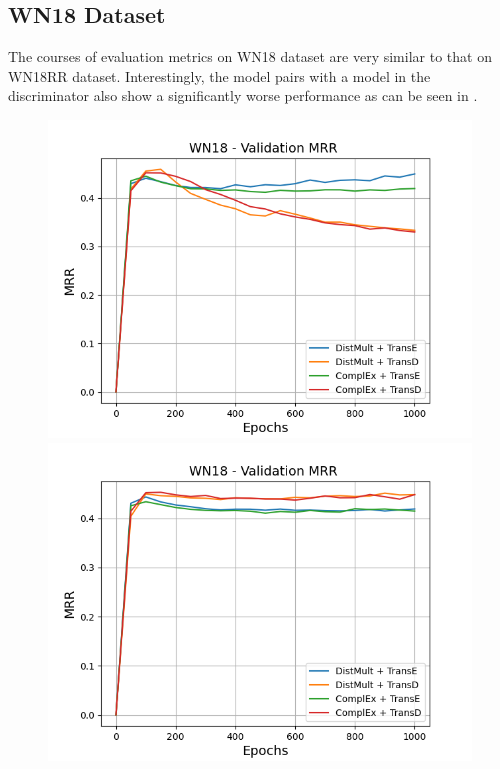 \subsection{WN18 Dataset}
\label{subsec:methods_wn18}


The courses of evaluation metrics on \textsc{WN18} dataset are very similar to that on \textsc{WN18RR} dataset.
Interestingly, the model pairs with a \transd model in the discriminator also show a significantly worse performance as can be seen in .
\begin{figure}
    \centering
    \begin{minipage}{.5\textwidth}
      \centering
      \includegraphics[width=0.9\linewidth]{figures/results/gan_train/not_pretrained/uncertainty/max/entropy/wn18/uncertainty_wn18_mrrs.png}
    \end{minipage}%
    \begin{minipage}{.5\textwidth}
      \centering
      \includegraphics[width=0.9\linewidth]{figures/results/gan_train/not_pretrained/uncertainty/max_distribution/entropy/wn18/uncertainty_wn18_mrrs.png}

\end{minipage}
\end{figure}
